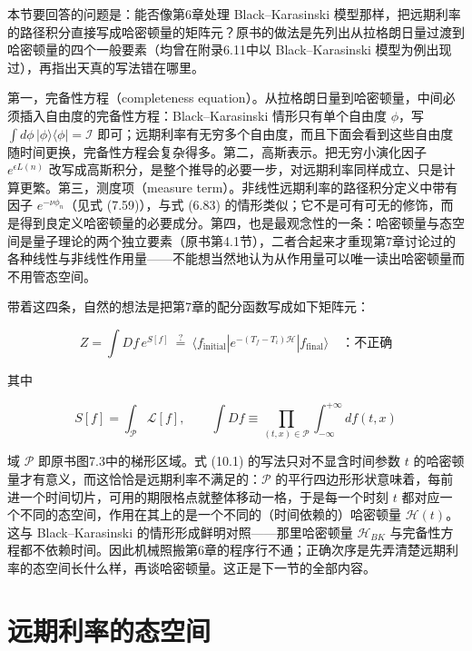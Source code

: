 本节要回答的问题是：能否像第6章处理 Black–Karasinski 模型那样，把远期利率的路径积分直接写成哈密顿量的矩阵元？原书的做法是先列出从拉格朗日量过渡到哈密顿量的四个一般要素（均曾在附录6.11中以 Black–Karasinski 模型为例出现过），再指出天真的写法错在哪里。

第一，完备性方程（completeness equation）。从拉格朗日量到哈密顿量，中间必须插入自由度的完备性方程：Black–Karasinski 情形只有单个自由度 $\phi$，写 $\int d\phi\,|\phi\rangle\langle\phi|=\mathcal{I}$ 即可；远期利率有无穷多个自由度，而且下面会看到这些自由度随时间更换，完备性方程会复杂得多。第二，高斯表示。把无穷小演化因子 $e^{\epsilon L(n)}$ 改写成高斯积分，是整个推导的必要一步，对远期利率同样成立、只是计算更繁。第三，测度项（measure term）。非线性远期利率的路径积分定义中带有因子 $e^{-\nu\phi_n}$（见式 (7.59)），与式 (6.83) 的情形类似；它不是可有可无的修饰，而是得到良定义哈密顿量的必要成分。第四，也是最观念性的一条：哈密顿量与态空间是量子理论的两个独立要素（原书第4.1节），二者合起来才重现第7章讨论过的各种线性与非线性作用量——不能想当然地认为从作用量可以唯一读出哈密顿量而不用管态空间。

带着这四条，自然的想法是把第7章的配分函数写成如下矩阵元：

\begin{equation*}
Z=\int Df\,e^{S[f]}\ \overset{?}{=}\ \langle f_{\text{initial}}|e^{-(T_f-T_i)\mathcal{H}}|f_{\text{final}}\rangle
\quad\text{：不正确}
\tag{10.1}
\end{equation*}

其中

\begin{equation*}
S[f]=\int_{\mathcal{P}}\mathcal{L}[f],\qquad
\int Df\equiv\prod_{(t,x)\in\mathcal{P}}\int_{-\infty}^{+\infty}df(t,x)
\end{equation*}

域 $\mathcal{P}$ 即原书图7.3中的梯形区域。式 (10.1) 的写法只对不显含时间参数 $t$ 的哈密顿量才有意义，而这恰恰是远期利率不满足的：$\mathcal{P}$ 的平行四边形形状意味着，每前进一个时间切片，可用的期限格点就整体移动一格，于是每一个时刻 $t$ 都对应一个不同的态空间，作用在其上的是一个不同的（时间依赖的）哈密顿量 $\mathcal{H}(t)$。这与 Black–Karasinski 的情形形成鲜明对照——那里哈密顿量 $\mathcal{H}_{BK}$ 与完备性方程都不依赖时间。因此机械照搬第6章的程序行不通；正确次序是先弄清楚远期利率的态空间长什么样，再谈哈密顿量。这正是下一节的全部内容。

\section{远期利率的态空间}

